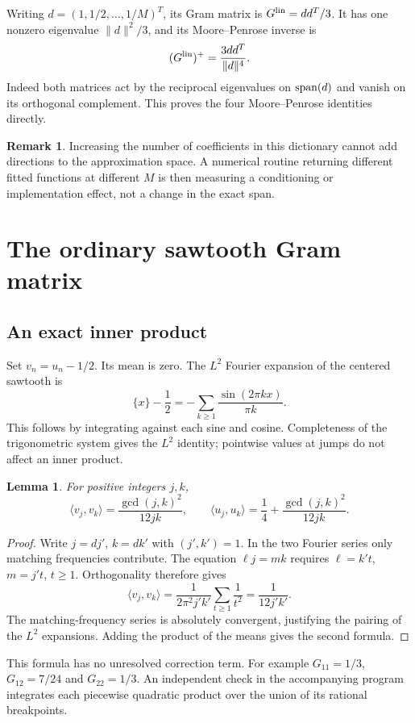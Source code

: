 \documentclass[11pt]{amsart}
\newtheorem{lemma}[theorem]{Lemma}
\theoremstyle{definition}
\newtheorem{remark}[theorem]{Remark}
\begin{document}
Writing $d=(1,1/2,\ldots,1/M)^T$, its Gram matrix is
$G^{\rm lin}=dd^T/3$. It has one nonzero eigenvalue $\|d\|^2/3$,
and its Moore--Penrose inverse is
\[
 (G^{\rm lin})^+=\frac{3dd^T}{\|d\|^4}.
\]
Indeed both matrices act by the reciprocal eigenvalues on $\operatorname{span}(d)$
and vanish on its orthogonal complement. This proves the four
Moore--Penrose identities directly.

\begin{remark}
Increasing the number of coefficients in this dictionary cannot add
directions to the approximation space. A numerical routine returning
different fitted functions at different $M$ is then measuring a
conditioning or implementation effect, not a change in the exact span.
\end{remark}

\section{The ordinary sawtooth Gram matrix}
\subsection{An exact inner product}
Set $v_n=u_n-1/2$. Its mean is zero. The $L^2$ Fourier expansion
of the centered sawtooth is
\[
 \{x\}-\frac12=-\sum_{k\ge1}\frac{\sin(2\pi kx)}{\pi k}.
\]
This follows by integrating against each sine and cosine. Completeness
of the trigonometric system gives the $L^2$ identity; pointwise values
at jumps do not affect an inner product.

\begin{lemma}\label{lem:gcdgram}
For positive integers $j,k$,
\[
 \langle v_j,v_k\rangle=\frac{\gcd(j,k)^2}{12jk},\qquad
 \langle u_j,u_k\rangle=\frac14+\frac{\gcd(j,k)^2}{12jk}.
\]
\end{lemma}
\begin{proof}
Write $j=dj'$, $k=dk'$ with $(j',k')=1$. In the two Fourier
series only matching frequencies contribute. The equation
$\ell j=mk$ requires $\ell=k't$, $m=j't$, $t\ge1$. Orthogonality
therefore gives
\[
 \langle v_j,v_k\rangle
   =\frac1{2\pi^2j'k'}\sum_{t\ge1}\frac1{t^2}
   =\frac1{12j'k'}.
\]
The matching-frequency series is absolutely convergent, justifying
the pairing of the $L^2$ expansions. Adding the product of the means
gives the second formula.
\end{proof}

This formula has no unresolved correction term. For example
$G_{11}=1/3$, $G_{12}=7/24$ and $G_{22}=1/3$.
An independent check in the accompanying program integrates each
piecewise quadratic product over the union of its rational breakpoints.
\end{document}
